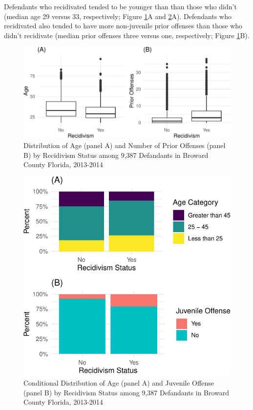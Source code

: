 \documentclass[12pt, twoside]{amherstthesis}
\begin{document}
Defendants who recidivated tended to be younger than than those who didn't (median age 29 versus 33, respectively; Figure \ref{fig:ch3fig5}A and \ref{fig:ch3fig6}A). Defendants who recidivated also tended to have more non-juvenile prior offenses than those who didn't recidivate (median prior offenses three versus one, respectively; Figure \ref{fig:ch3fig5}B).
\begin{figure}

{\centering \includegraphics{Dasha-Asienga_StatThesis_files/figure-latex/ch3fig5-1} 

}

\caption{Distribution of Age (panel A) and Number of Prior Offenses (panel B) by Recidivism Status among 9,387 Defandants in Broward County Florida, 2013-2014}\label{fig:ch3fig5}
\end{figure}
\begin{figure}

{\centering \includegraphics{Dasha-Asienga_StatThesis_files/figure-latex/ch3fig6-1} 

}

\caption{Conditional Distribution of Age (panel A) and Juvenile Offense (panel B) by Recidivism Status among 9,387 Defandants in Broward County Florida, 2013-2014}\label{fig:ch3fig6}
\end{figure}
\end{document}
